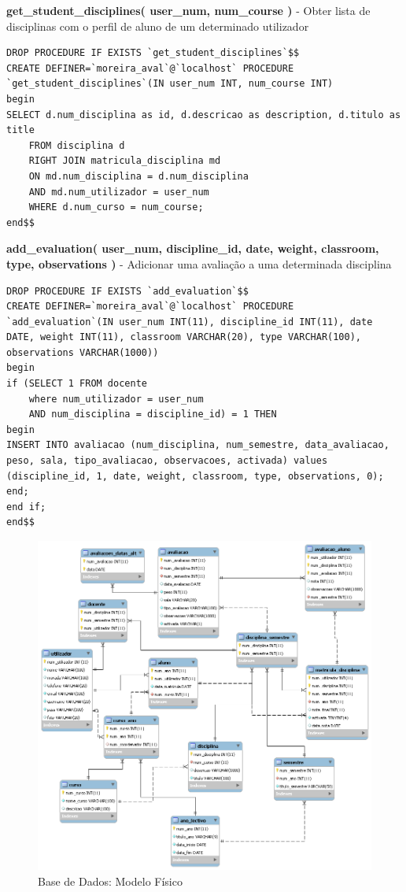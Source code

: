 \begin{list}{\textbf{-}}{\textbf{STORED PROCEDURES}}
\item \textbf{get\_student\_disciplines( user\_num, num\_course )} - Obter lista de disciplinas com o perfil de aluno de um determinado utilizador
\begin{lstlisting}
DROP PROCEDURE IF EXISTS `get_student_disciplines`$$
CREATE DEFINER=`moreira_aval`@`localhost` PROCEDURE `get_student_disciplines`(IN user_num INT, num_course INT)
begin
SELECT d.num_disciplina as id, d.descricao as description, d.titulo as title
	FROM disciplina d
	RIGHT JOIN matricula_disciplina md
	ON md.num_disciplina = d.num_disciplina
	AND md.num_utilizador = user_num
	WHERE d.num_curso = num_course;
end$$
\end{lstlisting}

\item \textbf{add\_evaluation( user\_num, discipline\_id, date, weight, classroom, type, observations )} - Adicionar uma avaliação a uma determinada disciplina
\begin{lstlisting}
DROP PROCEDURE IF EXISTS `add_evaluation`$$
CREATE DEFINER=`moreira_aval`@`localhost` PROCEDURE `add_evaluation`(IN user_num INT(11), discipline_id INT(11), date DATE, weight INT(11), classroom VARCHAR(20), type VARCHAR(100), observations VARCHAR(1000))
begin
if (SELECT 1 FROM docente 
	where num_utilizador = user_num 
	AND num_disciplina = discipline_id) = 1 THEN 
begin
INSERT INTO avaliacao (num_disciplina, num_semestre, data_avaliacao, peso, sala, tipo_avaliacao, observacoes, activada) values (discipline_id, 1, date, weight, classroom, type, observations, 0); 
end;
end if;
end$$
\end{lstlisting}

\end{list}

\begin{figure}[!htbp]
\centering
\includegraphics[width=17cm]{imagens/base_de_dados.png}
\caption{Base de Dados: Modelo Físico}
\label{fig:modelo_fisico}
\end{figure}

